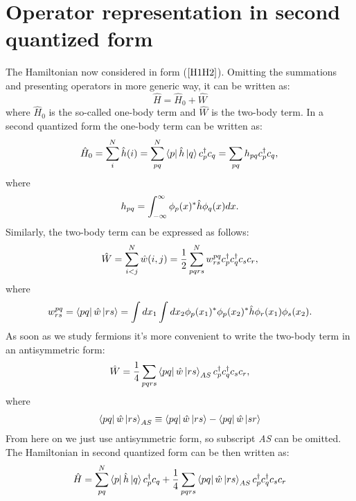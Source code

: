 \documentclass[twoside,english]{uiofysmaster}
\theoremstyle{definition}
\begin{document}
\section{Operator representation in second quantized form} \label{sec:operator in 2q}
The Hamiltonian now considered in form ($\ref{H1H2}$). Omitting the summations and presenting operators in more generic way, it can be written as:
\begin{equation}
\hat{H}=\hat{H}_0+\hat{W}
\end{equation}
where $\hat{H}_0$ is the so-called one-body term and $\hat{W}$ is the two-body term.
In a second quantized form the one-body term can be written as:
\begin{equation}
\hat{H}_0 = \sum_i^N\hat{h}(i)=\sum_{pq}^{N}\bra{p}\hat{h}\ket{q}c_p^\dagger c_q=\sum_{pq}h_{pq}c_p^\dagger c_q, \\ \label{eq:H0}
\end{equation}
where
\begin{equation}
h_{pq}=\int_{-\infty}^{\infty}\phi_p(x)^* \hat{h}\phi_q(x) dx.\\
\end{equation}
Similarly, the two-body term can be expressed as follows:
\begin{equation}
\hat{W}=\sum_{i<j}^{N} \hat{w}(i,j)=\frac{1}{2}\sum_{pqrs}^{N} w_{rs}^{pq}c_p^\dagger c_q^\dagger c_sc_r\\ \label{eq:W},
\end{equation}
where
\begin{equation}
w_{rs}^{pq}=\bra{pq}\hat{w}\ket{rs}=\int dx_1 \int dx_2 \phi_p(x_1)^*\phi_p(x_2)^* \hat{h}\phi_r(x_1)\phi_s(x_2). 
\end{equation}
As soon as we study fermions it's more convenient to write the two-body term in an antisymmetric form:
\begin{gather}\label{eq:two-body_2q}
	\hat{W}=\frac{1}{4}\sum_{pqrs} \bra{pq}\hat{w}\ket{rs}_{AS} c_p^\dagger c_q^\dagger c_sc_r,
\end{gather}
where
\begin{gather}
	\bra{pq}\hat{w}\ket{rs}_{AS}\equiv \bra{pq}\hat{w}\ket{rs}-\bra{pq}\hat{w}\ket{sr}
\end{gather}
From here on we just use antisymmetric form, so subscript \textit{AS} can be omitted.\\
The Hamiltonian in second quantized form can be then written as:
\begin{equation}\label{eq:Ham in 2q}
\hat{H}=\sum_{pq}^{N}\bra{p}\hat{h}\ket{q}c_p^\dagger c_q + \frac{1}{4}\sum_{pqrs} \bra{pq}\hat{w}\ket{rs}_{AS} c_p^\dagger c_q^\dagger c_sc_r
\end{equation}
\end{document}
